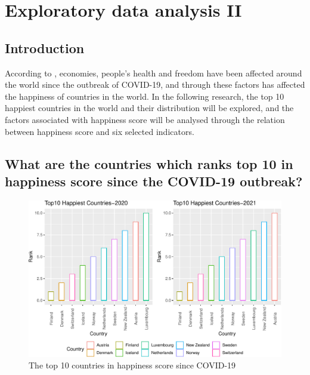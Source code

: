 \documentclass[11pt,a4paper,]{article}
\begin{document}
\hypertarget{exploratory-data-analysis-ii}{%
\section{Exploratory data analysis II}\label{exploratory-data-analysis-ii}}

\hypertarget{introduction-2}{%
\subsection{Introduction}\label{introduction-2}}

According to \textcite{helliwell2021world}, economies, people's health and freedom have been affected around the world since the outbreak of COVID-19, and through these factors has affected the happiness of countries in the world. In the following research, the top 10 happiest countries in the world and their distribution will be explored, and the factors associated with happiness score will be analysed through the relation between happiness score and six selected indicators.

\hypertarget{what-are-the-countries-which-ranks-top-10-in-happiness-score-since-the-covid-19-outbreak}{%
\subsection{What are the countries which ranks top 10 in happiness score since the COVID-19 outbreak?}\label{what-are-the-countries-which-ranks-top-10-in-happiness-score-since-the-covid-19-outbreak}}

\begin{figure}
\centering
\includegraphics{Assignment4_files/figure-latex/top10-1.pdf}
\caption{\label{fig:top10}The top 10 countries in happiness score since COVID-19}
\end{figure}
\end{document}
